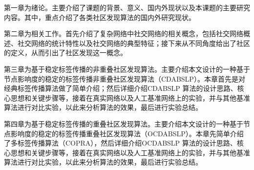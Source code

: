 第一章为绪论。主要介绍了课题的背景、意义、国内外现状以及本课题的主要研究内容。其中，重点介绍了各类社区发现算法的国内外研究现状。

第二章为相关工作。首先介绍了复杂网络中社交网络的相关概念，包括社交网络概述、社交网络的统计特性以及社交网络的典型特征；接下来从不同角度给出了社区的定义，从而引出了社区发现这一概念。

第三章为基于稳定标签传播的非重叠社区发现算法。主要介绍本文设计的一种基于节点影响度的稳定的标签传播非重叠社区发现算法（CDABSLP）。本章首先是对经典标签传播算法做了简单介绍；然后详细介绍CDABSLP 算法的设计思路、核心思想和关键步骤等，接着在真实网络以及人工基准网络上的实验，并与其他基准算法进行对比实验，以此来分析算法的效果，最后进行实验总结。

第四章为基于稳定标签传播的重叠社区发现算法。主要介绍本文设计的一种基于节点影响度的稳定的标签传播重叠社区发现算法（OCDABSLP）。本章先简单介绍了多标签传播算法（COPRA），然后详细介绍OCDABSLP 算法的设计思路、核心思想和关键步骤等，接着在真实网络以及人工基准网络上的实验，并与其他基准算法进行对比实验，以此来分析算法的效果，最后进行实验总结。
